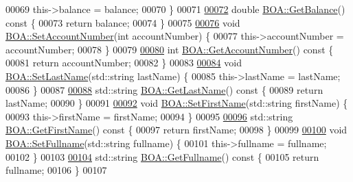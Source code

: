 \begin{DoxyCode}
00069     this->balance = balance;
00070 \}
00071 
\hypertarget{_b_o_a_8cpp_source.tex_l00072}{}\hyperlink{class_b_o_a_a07e30b7e5f5f20392b94af7344fd550c}{00072} \textcolor{keywordtype}{double} \hyperlink{class_b_o_a_a07e30b7e5f5f20392b94af7344fd550c}{BOA::GetBalance}()\textcolor{keyword}{ const }\{
00073     \textcolor{keywordflow}{return} balance;
00074 \}
00075 
\hypertarget{_b_o_a_8cpp_source.tex_l00076}{}\hyperlink{class_b_o_a_a6b85963680344bd719ab862a50a09588}{00076} \textcolor{keywordtype}{void} \hyperlink{class_b_o_a_a6b85963680344bd719ab862a50a09588}{BOA::SetAccountNumber}(\textcolor{keywordtype}{int} accountNumber) \{
00077     this->accountNumber = accountNumber;
00078 \}
00079 
\hypertarget{_b_o_a_8cpp_source.tex_l00080}{}\hyperlink{class_b_o_a_ad64bd63675f8902153aa6767994f05dc}{00080} \textcolor{keywordtype}{int} \hyperlink{class_b_o_a_ad64bd63675f8902153aa6767994f05dc}{BOA::GetAccountNumber}()\textcolor{keyword}{ const }\{
00081     \textcolor{keywordflow}{return} accountNumber;
00082 \}
00083 
\hypertarget{_b_o_a_8cpp_source.tex_l00084}{}\hyperlink{class_b_o_a_a7ea44308c05532cd11ff3ce8f14ea4c2}{00084} \textcolor{keywordtype}{void} \hyperlink{class_b_o_a_a7ea44308c05532cd11ff3ce8f14ea4c2}{BOA::SetLastName}(std::string lastName) \{
00085     this->lastName = lastName;
00086 \}
00087 
\hypertarget{_b_o_a_8cpp_source.tex_l00088}{}\hyperlink{class_b_o_a_a081383edefc1f66b80c3fb8862ab070b}{00088} std::string \hyperlink{class_b_o_a_a081383edefc1f66b80c3fb8862ab070b}{BOA::GetLastName}()\textcolor{keyword}{ const }\{
00089     \textcolor{keywordflow}{return} lastName;
00090 \}
00091 
\hypertarget{_b_o_a_8cpp_source.tex_l00092}{}\hyperlink{class_b_o_a_a32fabc2b3acde832f3749696b302a0fe}{00092} \textcolor{keywordtype}{void} \hyperlink{class_b_o_a_a32fabc2b3acde832f3749696b302a0fe}{BOA::SetFirstName}(std::string firstName) \{
00093     this->firstName = firstName;
00094 \}
00095 
\hypertarget{_b_o_a_8cpp_source.tex_l00096}{}\hyperlink{class_b_o_a_ae6bb3df4e1fb210610325ffd1985c7c0}{00096} std::string \hyperlink{class_b_o_a_ae6bb3df4e1fb210610325ffd1985c7c0}{BOA::GetFirstName}()\textcolor{keyword}{ const }\{
00097     \textcolor{keywordflow}{return} firstName;
00098 \}
00099 
\hypertarget{_b_o_a_8cpp_source.tex_l00100}{}\hyperlink{class_b_o_a_a7ff134d56805088f46df8eb6f21a0a45}{00100} \textcolor{keywordtype}{void} \hyperlink{class_b_o_a_a7ff134d56805088f46df8eb6f21a0a45}{BOA::SetFullname}(std::string fullname) \{
00101     this->fullname = fullname;
00102 \}
00103 
\hypertarget{_b_o_a_8cpp_source.tex_l00104}{}\hyperlink{class_b_o_a_afafa24a20fda93382782cab66a3079ee}{00104} std::string \hyperlink{class_b_o_a_afafa24a20fda93382782cab66a3079ee}{BOA::GetFullname}()\textcolor{keyword}{ const }\{
00105     \textcolor{keywordflow}{return} fullname;
00106 \}
00107 
\end{DoxyCode}
